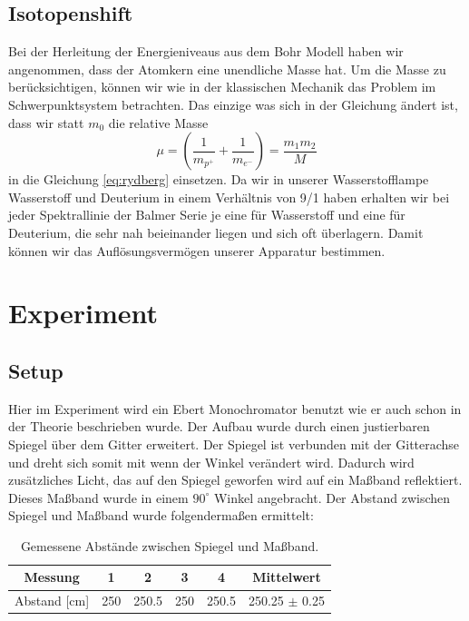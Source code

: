 \documentclass[]{article}
\begin{document}
\subsection{Isotopenshift}
Bei der Herleitung der Energieniveaus aus dem Bohr Modell haben wir angenommen, dass der Atomkern eine unendliche Masse hat. Um die Masse zu berücksichtigen, können wir wie in der klassischen Mechanik das Problem im Schwerpunktsystem betrachten. Das einzige was sich in der Gleichung ändert ist, dass wir statt $m_0$ die relative Masse 
\begin{equation}
	\mu=\left(\frac{1}{m_{p^+}}+\frac{1}{m_{e^-}}  \right)= \frac{m_1 m_2}{M}
\end{equation}
in die Gleichung \ref{eq:rydberg} einsetzen. Da wir in unserer Wasserstofflampe Wasserstoff und Deuterium in einem Verhältnis von 9/1 haben erhalten wir bei jeder Spektrallinie der Balmer Serie je eine für Wasserstoff und eine für Deuterium, die sehr nah beieinander liegen und sich oft überlagern. Damit können wir das Auflösungsvermögen unserer Apparatur bestimmen.




\newpage
\section{Experiment}
\subsection{Setup}

Hier im Experiment wird ein Ebert Monochromator benutzt wie er auch schon in der Theorie beschrieben wurde. Der Aufbau wurde durch einen justierbaren Spiegel über dem Gitter erweitert. Der Spiegel ist verbunden mit der Gitterachse und dreht sich somit mit wenn der Winkel verändert wird. Dadurch wird zusätzliches Licht, das auf den Spiegel geworfen wird auf ein Maßband reflektiert. Dieses Maßband wurde in einem $90^\circ$ Winkel angebracht. Der Abstand zwischen Spiegel und Maßband wurde folgendermaßen ermittelt:

\begin{table}[h!]
	\centering
	\begin{tabular}{c|c|c|c|c|c}
		Messung & 1 & 2 & 3 & 4 & Mittelwert \\
		\hline
		Abstand [cm] & 250 & 250.5 & 250 & 250.5 & 250.25 $\pm$ 0.25 \\
	\end{tabular}
	\caption{Gemessene Abstände zwischen Spiegel und Maßband.}
\end{table}
\end{document}
